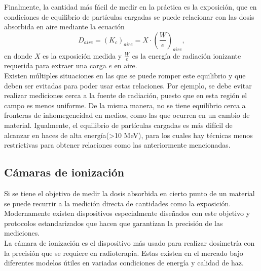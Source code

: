 Finalmente, la cantidad más fácil de medir en la práctica es la exposición, que en condiciones de equilibrio de partículas cargadas se puede relacionar con las dosis absorbida en aire mediante la ecuación
\begin{equation}
\label{eqn:ExpoDosis}
	D_{aire}=(K_c)_{aire}=X\cdot \left(\frac{W}{e}\right)_{aire},
\end{equation}
en donde $X$ es la exposición medida y  $\frac{W}{e}$ es la energía de radiación ionizante requerida para extraer una carga $e$ en aire.\\

Existen múltiples situaciones en las que se puede romper este equilibrio y que deben ser evitadas para poder usar estas relaciones. Por ejemplo, se debe evitar realizar mediciones cerca a la fuente de radiación, puesto que en esta región el campo es menos uniforme. De la misma manera, no se tiene equilibrio cerca a fronteras de inhomegeneidad en medios, como las que ocurren en un cambio de material. Igualmente, el equilibrio de partículas cargadas es más difícil de alcanzar en haces de alta energía(>10 MeV), para los cuales hay técnicas menos restrictivas para obtener relaciones como las anteriormente mencionadas.  
\subsection{Cámaras de ionización}
Si se tiene el objetivo de medir la dosis absorbida en cierto punto de un material se puede recurrir a la medición directa de cantidades como la exposición. Modernamente existen dispositivos especialmente diseñados con este objetivo y protocolos estandarizados que hacen que garantizan la precisión de las mediciones. \\

La cámara de ionización es el dispositivo más usado para realizar dosimetría con la precisión que se requiere en radioterapia. Estas existen en el mercado bajo diferentes modelos útiles en variadas condiciones de energía y calidad de haz.\\

